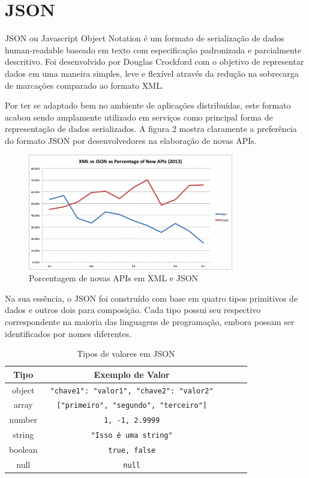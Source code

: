 \section{JSON}

JSON ou Javascript Object Notation é um formato de serialização de dados human-readable baseado em texto com especificação padronizada e parcialmente descritivo. Foi desenvolvido por Douglas Crockford com o objetivo de representar dados em uma maneira simples, leve e flexível através da redução na sobrecarga de marcações comparado ao formato XML.

Por ter se adaptado bem no ambiente de aplicações distribuídas, este formato acabou sendo amplamente utilizado em serviços como principal forma de representação de dados serializados. A figura 2 mostra claramente a preferência do formato JSON por desenvolvedores na elaboração de novas APIs. \cite{Duvander2013}

\begin{figure}[H]
  \centering    
  \includegraphics[width=0.8\textwidth,height=\textheight,keepaspectratio]{figuras/xml-vs-json.png}
  \caption{Porcentagem de novas APIs em XML e JSON}
\end{figure}

Na sua essência, o JSON foi construído com base em quatro tipos primitivos de dados e outros dois para composição. Cada tipo possui seu respectivo correspondente na maioria das linguagens de programação, embora possam ser identificados por nomes diferentes. \cite{Droettboom2015}

\begin{table}[H]
  \centering
  \begin{tabular}{|c|c|c|c|c|}
    \hline
    Tipo & Exemplo de Valor \\
    \hline
    object & \texttt{ {"chave1": "valor1", "chave2": "valor2"} } \\
    \hline
    array & \texttt{ ["primeiro", "segundo", "terceiro"] } \\
    \hline
    number & \texttt{ 1, -1, 2.9999 } \\
    \hline
    string & \texttt{ "Isso é uma string" } \\
    \hline
    boolean & \texttt{ true, false } \\
    \hline
    null & \texttt{ null } \\
    \hline
  \end{tabular}
  \caption{Tipos de valores em JSON}
\end{table}

